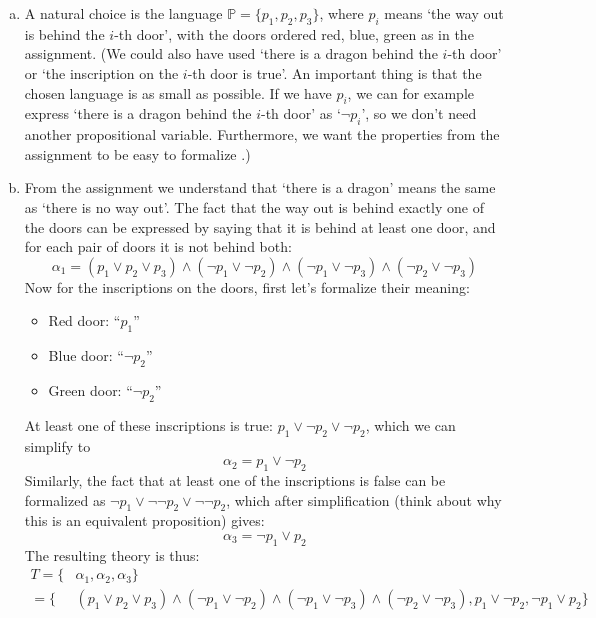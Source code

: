 \begin{problem}
    \begin{solution}
        \begin{enumerate}[(a)]
            \item A natural choice is the language $\mathbb P=\{p_1, p_2, p_3\}$, where $p_i$ means `the way out is behind the $i$-th door', with the doors ordered red, blue, green as in the assignment. (We could also have used `there is a dragon behind the $i$-th door' or `the inscription on the $i$-th door is true'. An important thing is that the chosen language is as small as possible. If we have $p_i$, we can for example express `there is a dragon behind the $i$-th door' as `$\neg p_i$', so we don’t need another propositional variable. Furthermore, we want the properties from the assignment to be easy to formalize
            .)
            \item From the assignment we understand that `there is a dragon' means the same as `there is no way out'. The fact that the way out is behind exactly one of the doors can be expressed by saying that it is behind at least one door, and for each pair of doors it is not behind both:
            $$
            \alpha_1=(p_1\lor p_2\lor p_3) \land (\neg p_1\lor\neg p_2) \land  (\neg p_1\lor\neg p_3) \land (\neg p_2\lor\neg p_3)
            $$
            Now for the inscriptions on the doors, first let’s formalize their meaning:
            \begin{itemize}
                \item Red door: ``$p_1$''
                \item Blue door: ``$\neg p_2$''
                \item Green door: ``$\neg p_2$''
            \end{itemize}
            At least one of these inscriptions is true: $p_1\lor \neg p_2\lor\neg p_2$, which we can simplify to
            $$
            \alpha_2=p_1\lor \neg p_2
            $$
            Similarly, the fact that at least one of the inscriptions is false can be formalized as $\neg p_1\lor \neg \neg p_2\lor\neg \neg p_2$, which after simplification (think about why this is an equivalent proposition) gives:
            $$
            \alpha_3=\neg p_1\lor p_2
            $$
            The resulting theory is thus:
            \begin{align*}
                T=\{&\alpha_1,\alpha_2,\alpha_3\}\\=\{&(p_1\lor p_2\lor p_3) \land (\neg p_1\lor\neg p_2) \land  (\neg p_1\lor\neg p_3) \land (\neg p_2\lor\neg p_3), p_1\lor \neg p_2, \neg p_1\lor p_2\}

\end{align*}
\end{enumerate}
\end{solution}
\end{problem}
